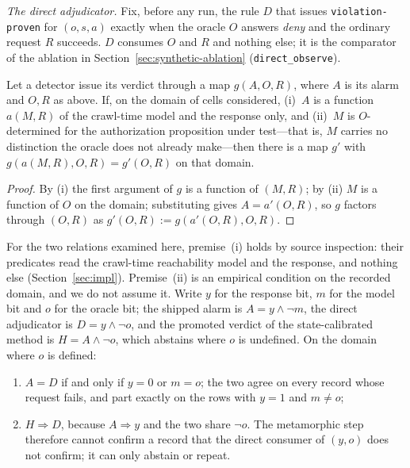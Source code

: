 \emph{The direct adjudicator.} Fix, before any run, the rule $D$ that issues
\texttt{violation-proven} for $(o,s,a)$ exactly when the oracle $O$ answers \emph{deny}
and the ordinary request $R$ succeeds. $D$ consumes $O$ and $R$ and nothing else; it is
the comparator of the ablation in Section~\ref{sec:synthetic-ablation}
(\texttt{direct\_observe}).

\begin{lemma}[absorption]
\label{lem:absorption}
Let a detector issue its verdict through a map $g(A,O,R)$, where $A$ is its alarm and
$O,R$ as above. If, on the domain of cells considered, (i)~$A$ is a function $a(M,R)$ of
the crawl-time model and the response only, and (ii)~$M$ is $O$-determined for the
authorization proposition under test---that is, $M$ carries no distinction the oracle does
not already make---then there is a map $g'$ with $g(a(M,R),O,R)=g'(O,R)$ on that domain.
\end{lemma}

\begin{proof}
By (i) the first argument of $g$ is a function of $(M,R)$; by (ii) $M$ is a function of
$O$ on the domain; substituting gives $A=a'(O,R)$, so $g$ factors through $(O,R)$ as
$g'(O,R):=g(a'(O,R),O,R)$.
\end{proof}

\begin{proposition}
\label{lem:oracle-suff}
For the two relations examined here, premise~(i) holds by source inspection: their
predicates read the crawl-time reachability model and the response, and nothing else
(Section~\ref{sec:impl}). Premise~(ii) is an empirical condition on the recorded domain,
and we do not assume it. Write $y$ for the response bit, $m$ for the model bit and $o$
for the oracle bit; the shipped alarm is $A=y\wedge\neg m$, the direct adjudicator is
$D=y\wedge\neg o$, and the promoted verdict of the state-calibrated method is
$H=A\wedge\neg o$, which abstains where $o$ is undefined. On the domain where $o$ is
defined:
\begin{enumerate}
\item[(a)] $A=D$ if and only if $y=0$ or $m=o$; the two agree on every record whose
request fails, and part exactly on the rows with $y=1$ and $m\ne o$;
\item[(b)] $H\Rightarrow D$, because $A\Rightarrow y$ and the two share $\neg o$. The
metamorphic step therefore cannot confirm a record that the direct consumer of $(y,o)$
does not confirm; it can only abstain or repeat.
\end{enumerate}
\end{proposition}

